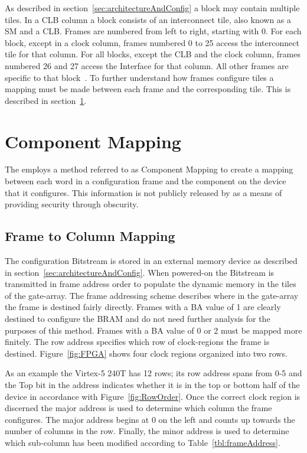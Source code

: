 As described in section~\ref{sec:architectureAndConfig} a block may contain multiple tiles.
In a \acrshort{CLB} column a block consists of an interconnect tile, also known as a \acrfull{SM} and a \acrshort{CLB}.
Frames are numbered from left to right, starting with 0. 
For each block, except in a clock column, frames numbered 0 to 25 access the interconnect tile for that column. 
For all blocks, except the \acrshort{CLB} and the clock column, frames numbered 26 and 27 access the Interface for that column. 
All other frames are specific to that block~\cite{virtex5ConfigGuide}.
To further understand how frames configure tiles a mapping must be made between each frame and the corresponding tile.
This is described in section~\ref{sec:tileMapping}.

\section{Component Mapping} \label{sec:tileMapping}
The \NameNoPeriod employs a method referred to as Component Mapping to create a mapping between each word in a configuration frame and the component on the device that it configures.
This information is not publicly released by \Xilinx as a means of providing security through obscurity.

\subsection{Frame to Column Mapping}
The configuration \gls{Bitstream} is stored in an external memory device as described in section~\ref{sec:architectureAndConfig}.
When powered-on the \gls{Bitstream} is transmitted in frame address order to populate the dynamic memory in the tiles of the gate-array.
The frame addressing scheme describes where in the gate-array the frame is destined fairly directly.
Frames with a \acrshort{BA} value of 1 are clearly destined to configure the \acrshort{BRAM} and do not need further analysis for the purposes of this method.
Frames with a \acrshort{BA} value of 0 or 2 must be mapped more finitely.
The row address specifies which row of clock-regions the frame is destined.
Figure~\ref{fig:FPGA} shows four clock regions organized into two rows. 

As an example the Virtex-5 240T has 12 rows; its row address spans from 0-5 and the Top bit in the address indicates whether it is in the top or bottom half of the device in accordance with Figure~\ref{fig:RowOrder}.
Once the correct clock region is discerned the major address is used to determine which column the frame configures.
The major address begins at 0 on the left and counts up towards the number of columns in the row.
Finally, the minor address is used to determine which sub-column has been modified according to Table~\ref{tbl:frameAddress}.
